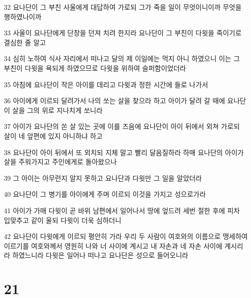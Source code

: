 \par 32 요나단이 그 부친 사울에게 대답하여 가로되 그가 죽을 일이 무엇이니이까 무엇을 행하였나이까
\par 33 사울이 요나단에게 단창을 던져 치려 한지라 요나단이 그 부친이 다윗을 죽이기로 결심한 줄 알고
\par 34 심히 노하여 식사 자리에서 떠나고 달의 제 이일에는 먹지 아니 하였으니 이는 그 부친이 다윗을 욕되게 하였으므로 다윗을 위하여 슬퍼함이었더라
\par 35 아침에 요나단이 작은 아이를 데리고 다윗과 정한 시간에 들로 나가서
\par 36 아이에게 이르되 달려가서 나의 쏘는 살을 찾으라 하고 아이가 달려 갈 때에 요나단이 살을 그의 위로 지나치게 쏘니라
\par 37 아이가 요나단의 쏜 살 있는 곳에 이를 즈음에 요나단이 아이 뒤에서 외쳐 가로되 살이 네 앞편에 있지 아니하냐 하고
\par 38 요나단이 아이 뒤에서 또 외치되 지체 말고 빨리 달음질하라 하매 요나단의 아이가 살을 주워가지고 주인에게로 돌아왔으나
\par 39 그 아이는 아무런지 알지 못하고 요나단과 다윗만 그 일을 알았더라
\par 40 요나단이 그 병기를 아이에게 주며 이르되 이것을 가지고 성으로가라
\par 41 아이가 가매 다윗이 곧 바위 남편에서 일어나서 땅에 엎드려 세번 절한 후에 피차 입맞추고 같이 울되 다윗이 더욱 심하더니
\par 42 요나단이 다윗에게 이르되 평안히 가라 우리 두 사람이 여호와의 이름으로 맹세하여 이르기를 여호와께서 영원히 나와 너 사이에 계시고 내 자손과 네 자손 사이에 계시리라 하였느니라 다윗은 일어나 떠나고 요나단은 성으로 들어오니라

\chapter{21}

